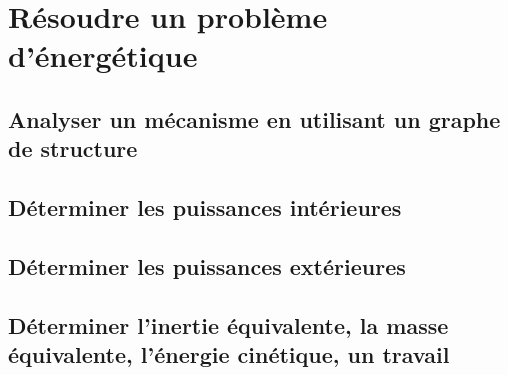 \graphicspath{{\repStyle/png/}{../DYN/DYN-06-PFD/03_TT/images/}} 
 
 
\graphicspath{{\repStyle/png/}{../DYN/DYN-06-PFD/04_RR/images/}} 
 
 
\graphicspath{{\repStyle/png/}{../DYN/DYN-06-PFD/05_RT/images/}} 
 
 
\graphicspath{{\repStyle/png/}{../DYN/DYN-06-PFD/06_TR/images/}} 
 
 
\graphicspath{{\repStyle/png/}{../DYN/DYN-06-PFD/07_RR3D/images/}} 
 
 
\graphicspath{{\repStyle/png/}{../DYN/DYN-06-PFD/08_RR3D/images/}} 
 
 
\graphicspath{{\repStyle/png/}{../DYN/DYN-06-PFD/09_RT_RSG/images/}} 
 
 
\graphicspath{{\repStyle/png/}{../DYN/DYN-06-PFD/46_RR_RSG/images/}} 
 
 
\graphicspath{{\repStyle/png/}{../DYN/DYN-06-PFD/50_BancBalafre/images/}} 
 
 
\clearpage 
\newpage 
\setchapterpreamble[u]{\margintoc} 
\chapter{Résoudre un problème d'énergétique} 
\section{Analyser un mécanisme en utilisant un graphe de structure} 
\clearpage 
\newpage 
\section{Déterminer les puissances intérieures} 
\clearpage 
\newpage 
\section{Déterminer les puissances extérieures} 
\clearpage 
\newpage 
\section{Déterminer l'inertie équivalente, la masse équivalente, l'énergie cinétique, un travail} 
\clearpage 
\newpage 
